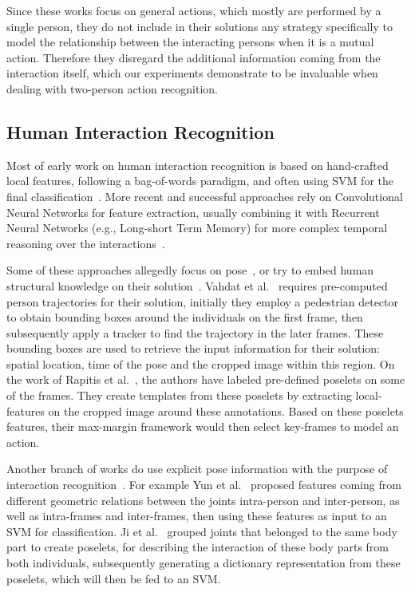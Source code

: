 \documentclass[journal,twoside]{IEEEtran}
\begin{document}
Since these works focus on general actions, which mostly are performed by a single person, they do not include in their solutions any strategy specifically to model the relationship between the interacting persons when it is a mutual action.
Therefore they disregard the additional information coming from the interaction itself, which our experiments demonstrate to be invaluable when dealing with two-person action recognition.

\subsection{Human Interaction Recognition}




Most of early work on human interaction recognition is based on hand-crafted local features, following a bag-of-words paradigm, and often using SVM for the final classification~\cite{Ryoo2009,Vahdat2011,Ryoo2011,Zhang2012,Rapitis2013}.
More recent and successful approaches rely on Convolutional Neural Networks for feature extraction, usually combining it with Recurrent Neural Networks (e.g., Long-short Term Memory) for more complex temporal reasoning over the interactions~\cite{Donahue2015,Aliakbarian2017,Shi2018,Ke2018}.


Some of these approaches allegedly focus on pose~\cite{Vahdat2011,Rapitis2013}, or try to embed human structural knowledge on their solution~\cite{Ke2018}.
Vahdat et al.~\cite{Vahdat2011} 
requires pre-computed person trajectories for their solution, initially they employ a pedestrian detector to obtain bounding boxes around the individuals on the first frame, then subsequently apply a tracker to find the trajectory in the later frames.
These bounding boxes are used to retrieve the input information for their solution: spatial location, time of the pose and the cropped image within this region.
On the work of Rapitis et al.~\cite{Rapitis2013}, the authors have labeled pre-defined poselets on some of the frames. They create templates from these poselets by extracting local-features on the cropped image around these annotations. 
Based on these poselets features, their max-margin framework would then select key-frames to model an action.


Another branch of works do use explicit pose information with the purpose of interaction recognition~\cite{Yun2012,Ji2014,Ji2015,Wu2018a}. 
For example Yun et al.~\cite{Yun2012} proposed features coming from different geometric relations between the joints intra-person and inter-person, as well as intra-frames and inter-frames, then using these features as input to an SVM for classification.
Ji et al.~\cite{Ji2014} grouped joints that belonged to the same body part to create poselets, for describing the interaction of these body parts from both individuals, subsequently generating a dictionary representation from these poselets, which will then be fed to an SVM.
\end{document}
